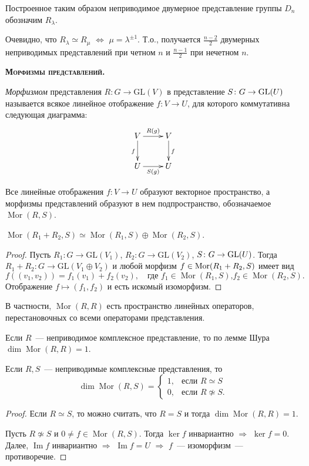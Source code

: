 \documentclass[a4paper]{article}
\newcommand*{\tema}[1]{\vspace{20pt}
\begin{center}{\textbf{\textsc{#1.}}}\vspace{5pt}
\end{center}}
\newcommand{\Mor}{\mathop{\mathrm{Mor}}\nolimits}
\renewcommand{\Im}{\mathop{\mathrm{Im}}\nolimits}
\newcommand*{\p}[1]{#1\nobreak\discretionary{}{\hbox{$\mathsurround=0pt #1$}}{}}
\begin{document}
Построенное таким образом неприводимое двумерное представление
группы $D_n$ обозначим $R_\lambda$.

Очевидно, что $R_\lambda\simeq R_\mu$ $\Leftrightarrow$
$\mu=\lambda^{\pm1}$. Т.о., получается $\frac{n-2}{2}$ двумерных
неприводимых представлений при четном $n$ и $\frac{n-1}{2}$ при
нечетном $n$.

\tema{Морфизмы представлений}

\emph{Морфизмом} представления $R\colon G\to \mathrm{GL}(V)$ в
представление $S\colon G\p\to \mathrm{GL}(U)$ называется всякое
линейное отображение $f\colon V\to U$, для которого коммутативна
следующая диаграмма:
$$\xymatrix{
 V \ar[r]^{R(g)} \ar[d]_f & V \ar[d]^f\\
 U \ar[r]_{S(g)} & U}$$

Все линейные отображения $f\colon V\to U$ образуют векторное
пространство, а морфизмы представлений образуют в нем
подпространство, обозначаемое $\Mor(R,S)$.

\begin{prop}
$\Mor(R_1+R_2,S)\simeq \Mor(R_1,S)\oplus\Mor(R_2,S)$.
\end{prop}

\begin{proof}
Пусть $R_1\colon G\to \mathrm{GL}(V_1)$, $R_2\colon G\to
\mathrm{GL}(V_2)$, $S\colon G\p\to \mathrm{GL}(U)$. Тогда
$R_1+R_2\colon G\to \mathrm{GL}(V_1\oplus V_2)$ и любой морфизм
$f\p\in\Mor(R_1+R_2,S)$ имеет вид
$$f((v_1,v_2))=f_1(v_1)+f_2(v_2), \quad \text{где $f_1\in \Mor(R_1,S)$,
$f_2\in\Mor(R_2,S)$.}$$ Отображение $f\mapsto (f_1,f_2)$ и есть
искомый изоморфизм.
\end{proof}

В частности, $\Mor(R,R)$ есть пространство линейных операторов,
перестановочных со всеми операторами представления.

Если $R$~--- неприводимое комплексное представление, то по лемме
Шура $\dim\Mor(R,R)=1$.

\begin{theorem}
\label{3.XIII}Если $R,S$~--- неприводимые комплексные представления,
то
$$\dim\Mor(R,S)=
\begin{cases}
1,&\text{если $R\simeq S$}\\
0,&\text{если $R\not\simeq S$}.
\end{cases}$$
\end{theorem}

\begin{proof}
Если $R\simeq S$, то можно считать, что $R=S$ и тогда
$\dim\Mor(R,R)=1$.

Пусть $R\not\simeq S$ и $0\neq f\in\Mor(R,S)$. Тогда $\ker f$
инвариантно $\Rightarrow$ $\ker f=0$. Далее, $\Im f$ инвариантно
$\Rightarrow$ $\Im f=U$ $\Rightarrow$ $f$~--- изоморфизм~---
противоречие.
\end{proof}
\end{document}
